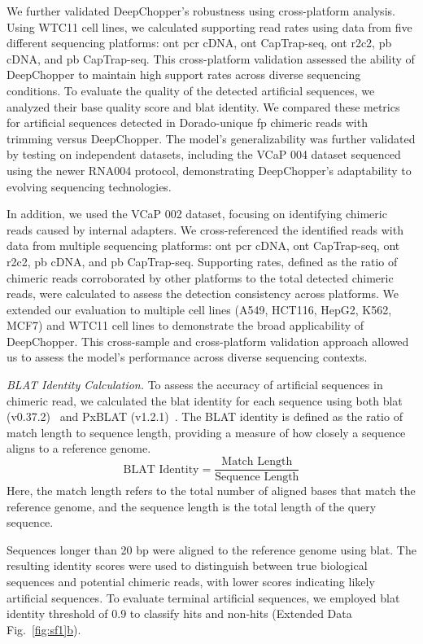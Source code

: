 \documentclass[pdflatex, sn-mathphys-num, lineno]{sn-jnl}%
\newcommand{\edfigref}[2]{Extended Data Fig.~\hyperref[#1]{\ref*{#1}#2}}
\theoremstyle{thmstyleone}%
\theoremstyle{thmstyletwo}%
\theoremstyle{thmstylethree}%
\begin{document}
We further validated DeepChopper's robustness using cross-platform analysis.
Using WTC11 cell lines, we calculated supporting read rates using data from five different sequencing platforms: \gls{ont} \gls{pcr} cDNA, \gls{ont} CapTrap-seq, \gls{ont} \gls{r2c2}, \gls{pb} cDNA, and \gls{pb} CapTrap-seq.
This cross-platform validation assessed the ability of DeepChopper to maintain high support rates across diverse sequencing conditions.
To evaluate the quality of the detected artificial sequences, we analyzed their base quality score and \gls{blat} identity.
We compared these metrics for artificial sequences detected in Dorado-unique \gls{fp} chimeric reads with trimming versus DeepChopper.
The model's generalizability was further validated by testing on independent datasets, including the VCaP 004 dataset sequenced using the newer RNA004 protocol, demonstrating DeepChopper's adaptability to evolving sequencing technologies.

In addition, we used the VCaP 002 dataset, focusing on identifying chimeric reads caused by internal adapters.
We cross-referenced the identified reads with data from multiple sequencing platforms: \gls{ont} \gls{pcr} cDNA, \gls{ont} CapTrap-seq, \gls{ont} \gls{r2c2}, \gls{pb} cDNA, and \gls{pb} CapTrap-seq.
Supporting rates, defined as the ratio of chimeric reads corroborated by other platforms to the total detected chimeric reads, were calculated to assess the detection consistency across platforms.
We extended our evaluation to multiple cell lines (A549, HCT116, HepG2, K562, MCF7) and WTC11 cell lines to demonstrate the broad applicability of DeepChopper.
This cross-sample and cross-platform validation approach allowed us to assess the model's performance across diverse sequencing contexts.

\textit{BLAT Identity Calculation.} To assess the accuracy of artificial sequences in chimeric read, we calculated the \gls{blat} identity for each sequence using both \gls{blat} (v0.37.2)~\cite{kent2002blat} and PxBLAT (v1.2.1)~\cite{li2024pxblat}.
The BLAT identity is defined as the ratio of match length to sequence length, providing a measure of how closely a sequence aligns to a reference genome.
\[
	\textrm{BLAT Identity} = \frac{\textrm{Match Length}}{\textrm{Sequence Length}}
\]
Here, the match length refers to the total number of aligned bases that match the reference genome, and the sequence length is the total length of the query sequence.

Sequences longer than 20 bp were aligned to the reference genome using \gls{blat}.
The resulting identity scores were used to distinguish between true biological sequences and potential chimeric reads, with lower scores indicating likely artificial sequences.
To evaluate terminal artificial sequences, we employed \gls{blat} identity threshold of 0.9 to classify hits and non-hits (\edfigref{fig:sf1}{b}).
\end{document}

